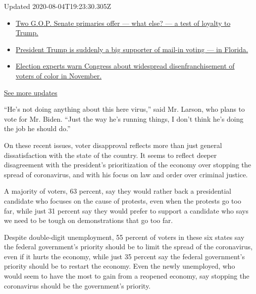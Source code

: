 Updated 2020-08-04T19:23:30.305Z

\begin{itemize}
\tightlist
\item
  \href{https://www.nytimes.com/2020/08/04/us/elections/primary-election-michigan-arizona-kansas.html?action=click\&pgtype=Article\&state=default\&region=MAIN_CONTENT_1\&context=storylines_live_updates\#link-3924dd44}{Two
  G.O.P. Senate primaries offer --- what else? --- a test of loyalty to
  Trump.}
\item
  \href{https://www.nytimes.com/2020/08/04/us/elections/primary-election-michigan-arizona-kansas.html?action=click\&pgtype=Article\&state=default\&region=MAIN_CONTENT_1\&context=storylines_live_updates\#link-32b39e33}{President
  Trump is suddenly a big supporter of mail-in voting --- in Florida.}
\item
  \href{https://www.nytimes.com/2020/08/04/us/elections/primary-election-michigan-arizona-kansas.html?action=click\&pgtype=Article\&state=default\&region=MAIN_CONTENT_1\&context=storylines_live_updates\#link-6d019753}{Election
  experts warn Congress about widespread disenfranchisement of voters of
  color in November.}
\end{itemize}

\href{https://www.nytimes.com/2020/08/04/us/elections/primary-election-michigan-arizona-kansas.html?action=click\&pgtype=Article\&state=default\&region=MAIN_CONTENT_1\&context=storylines_live_updates}{See
more updates}

``He's not doing anything about this here virus,'' said Mr. Larson, who
plans to vote for Mr. Biden. ``Just the way he's running things, I don't
think he's doing the job he should do.''

On these recent issues, voter disapproval reflects more than just
general dissatisfaction with the state of the country. It seems to
reflect deeper disagreement with the president's prioritization of the
economy over stopping the spread of coronavirus, and with his focus on
law and order over criminal justice.

A majority of voters, 63 percent, say they would rather back a
presidential candidate who focuses on the cause of protests, even when
the protests go too far, while just 31 percent say they would prefer to
support a candidate who says we need to be tough on demonstrations that
go too far.

Despite double-digit unemployment, 55 percent of voters in these six
states say the federal government's priority should be to limit the
spread of the coronavirus, even if it hurts the economy, while just 35
percent say the federal government's priority should be to restart the
economy. Even the newly unemployed, who would seem to have the most to
gain from a reopened economy, say stopping the coronavirus should be the
government's priority.

